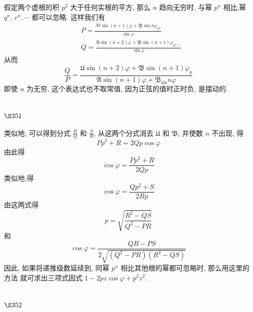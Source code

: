 假定两个虚根的积 $p^{2}$ 大于任何实根的平方, 那么 $n$ 趋向无穷时, 与幂 $p^{n}$ 相比,幂 $q^{n}$, $r^{n}, \cdots$ 都可以忽略. 这样我们有
\[
\begin{aligned}
& P=\frac{\mathscr{M} \sin (n+1) \varphi+\mathfrak{B} \sin n \varphi_{p^{n}}}{\sin \varphi} \\
& Q=\frac{\mathfrak{A} \sin (n+2) \varphi+\mathfrak{B} \sin (n+1) \varphi_{p^{n+1}}}{\sin \varphi}
\end{aligned}
\]
从而
\[
\frac{Q}{P}=\frac{\mathfrak{U} \sin (n+2) \varphi+\mathfrak{B} \sin (n+1) \varphi_{p}}{\mathfrak{A} \sin (n+1) \varphi+\mathfrak{B}_{\sin } n \varphi}
\]
即使 $n$ 为无穷, 这个表达式也不取常值, 因为正弦的值时正时负, 是摆动的.

\section{$\S 351$}

类似地, 可以得到分式 $\frac{R}{Q}$ 和 $\frac{S}{R}$, 从这两个分式消去 $\mathfrak{U}$ 和 $\mathfrak{B}$, 并使数 $n$ 不出现, 得
\[
P p^{2}+R=2 Q p \cos \varphi
\]
由此得
\[
\cos \varphi=\frac{P p^{2}+R}{2 Q p}
\]
类似地,得
\[
\cos \varphi=\frac{Q p^{2}+S}{2 R p}
\]
由这两式得
\[
p=\sqrt{\frac{R^{2}-Q S}{Q^{2}-P R}}
\]
和
\[
\cos \varphi=\frac{Q R-P S}{2 \sqrt{\left(Q^{2}-P R\right)\left(R^{2}-Q S\right)}}
\]
因此, 如果将递推级数延续到, 同幂 $p^{n}$ 相比其他根的幂都可忽略时, 那么用这里的方法 就可求出三项式因式 $1-2 p z \cos \varphi+p^{2} z^{2}$.

\section{$\S 352$}

